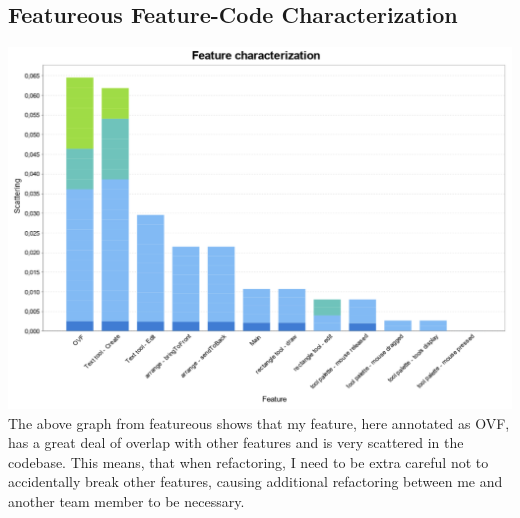 \subsection{Featureous Feature-Code Characterization}
\includegraphics[width=\textwidth]{Images/featurecharacterization.png}
The above graph from featureous shows that my feature, here annotated as OVF, has a great deal of overlap with other features and is very scattered in the codebase. This means, that when refactoring, I need to be extra careful not to accidentally break other features, causing additional refactoring between me and another team member to be necessary.

